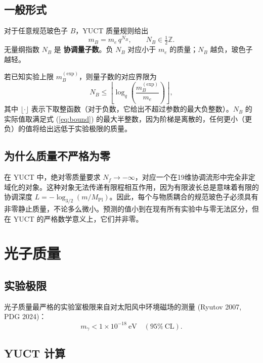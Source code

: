 \documentclass[12pt,a4paper]{article}
\newcommand{\Mpl}{M_{\mathrm{Pl}}}
\begin{document}
	\subsection{一般形式}
	
	对于任意规范玻色子 $B$，YUCT 质量规则给出
	\begin{equation}\label{eq:bosonmass}
		m_B = m_e \, q^{N_B}, \qquad N_B \in \tfrac12\mathbb{Z}.
	\end{equation}
	无量纲指数 $N_B$ 是 \textbf{协调量子数}。负 $N_B$ 对应小于 $m_e$ 的质量；$N_B$ 越负，玻色子越轻。
	
	若已知实验上限 $m_B^{\mathrm{(exp)}}$，则量子数的对应界限为
	\begin{equation}\label{eq:bound}
		N_B \le \left\lfloor \log_q\!\left( \frac{m_B^{\mathrm{(exp)}}}{m_e} \right) \right\rfloor ,
	\end{equation}
	其中 $\lfloor\cdot\rfloor$ 表示下取整函数（对于负数，它给出不超过参数的最大负整数）。$N_B$ 的实际值取满足式 (\ref{eq:bound}) 的最大半整数，因为阶梯是离散的，任何更小（更负）的值将给出远低于实验极限的质量。
	
	\subsection{为什么质量不严格为零}
	
	在 YUCT 中，绝对零质量要求 $N_f \to -\infty$，对应一个在19维协调流形中完全非定域化的对象。这种对象无法传递有限程相互作用，因为有限波长总是意味着有限的协调深度 $L = -\log_{3/2}(m/\Mpl)$。因此，每个与物质耦合的规范玻色子必须具有非零静止质量，不论多么微小。预测的值小到在现有所有实验中与零无法区分，但在 YUCT 的严格数学意义上，它们并非零。
	
	\section{光子质量}
	
	\subsection{实验极限}
	
	光子质量最严格的实验室极限来自对太阳风中环境磁场的测量 (Ryutov 2007, PDG 2024)：
	\begin{equation}\label{eq:photonlimit}
		m_\gamma < 1 \times 10^{-18}~\mathrm{eV} \quad (95\%~\mathrm{CL}).
	\end{equation}
	
	\subsection{YUCT 计算}
	
\end{document}
